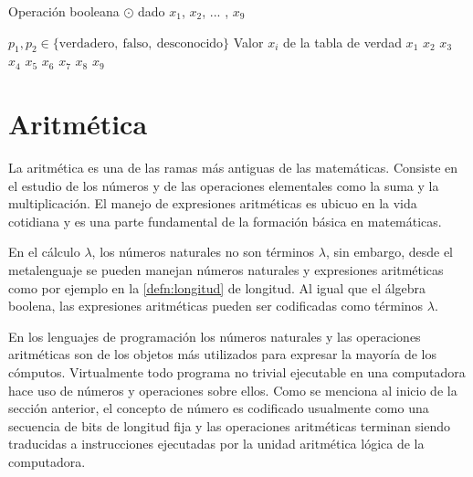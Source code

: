 \begin{algorithm}[ht]
  \caption{Operación booleana $ \odot $ dado $ x_{1} $, $ x_{2} $, ... , $ x_{9} $}
  \label{alg:op-bin-gen-2}
  \begin{algorithmic}
    \REQUIRE $ p_{1}, p_{2} \in \{ \mathrm{verdadero},\ \mathrm{falso},\ \mathrm{desconocido} \} $
    \ENSURE Valor $ x_{i} $ de la tabla de verdad
    \RETURN $ x_{1} $
    \RETURN $ x_{2} $
    \RETURN $ x_{3} $
    \ENDIF
    \RETURN $ x_{4} $
    \RETURN $ x_{5} $
    \RETURN $ x_{6} $
    \ENDIF
    \RETURN $ x_{7} $
    \RETURN $ x_{8} $
    \RETURN $ x_{9} $
    \ENDIF
    \ENDIF
  \end{algorithmic}
\end{algorithm}

\section{Aritmética}
\label{sec:aritmetica}

La aritmética es una de las ramas más antiguas de las matemáticas. Consiste en el estudio de los números y de las operaciones elementales como la suma y la multiplicación. El manejo de expresiones aritméticas es ubicuo en la vida cotidiana y es una parte fundamental de la formación básica en matemáticas.

En el cálculo $ λ $, los números naturales no son términos $ λ $, sin embargo, desde el metalenguaje se pueden manejan números naturales y expresiones aritméticas como por ejemplo en la \autoref{defn:longitud} de longitud. Al igual que el álgebra boolena, las expresiones aritméticas pueden ser codificadas como términos $ λ $.

En los lenguajes de programación los números naturales y las operaciones aritméticas son de los objetos más utilizados para expresar la mayoría de los cómputos. Virtualmente todo programa no trivial ejecutable en una computadora hace uso de números y operaciones sobre ellos. Como se menciona al inicio de la sección anterior, el concepto de número es codificado usualmente como una secuencia de bits de longitud fija y las operaciones aritméticas terminan siendo traducidas a instrucciones ejecutadas por la unidad aritmética lógica de la computadora.

